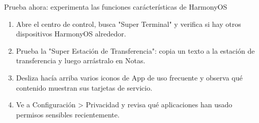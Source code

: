\begin{tcbpractice}{Prueba ahora: experimenta las funciones carácterísticas de HarmonyOS}
\begin{enumerate}
  \item Abre el centro de control, busca "Super Terminal" y verifica si hay otros dispositivos HarmonyOS alrededor.
  \item Prueba la "Super Estación de Transferencia": copia un texto a la estación de transferencia y luego arrástralo en Notas.
  \item Desliza hacía arriba varios iconos de App de uso frecuente y observa qué contenido muestran sus tarjetas de servicio.
  \item Ve a Configuración > Privacidad y revisa qué aplicaciones han usado permisos sensibles recientemente.
\end{enumerate}

\end{tcbpractice}
